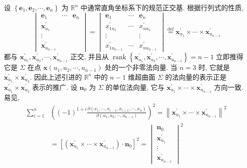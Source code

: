 \begin{definition}
设 $\left\{\boldsymbol{e}_{1}, \boldsymbol{e}_{2}, \cdots, \boldsymbol{e}_{n}\right\}$ 为 $\mathbb{R}^{n}$ 中通常直角坐标系下的规范正交基. 根据行列式的性质,
\[
  \begin{vmatrix}
    \boldsymbol{e}_{1} & \cdots & \boldsymbol{e}_{n} \\
    \boldsymbol{x}_{u_{1}}^{\prime} & & \\
    \vdots & & \\
    \boldsymbol{x}_{u_{n-1}}^{\prime} & &
  \end{vmatrix}
  =\begin{vmatrix}
    \boldsymbol{e}_{1} & \cdots & \boldsymbol{e}_{n} \\
    x_{1 u_{1}}^{\prime} & \cdots & x_{n u_{1}}^{\prime} \\
    \vdots & & \vdots \\
    x_{1 u_{n-1}}^{\prime} & \cdots & x_{n u_{n-1}}^{\prime}
  \end{vmatrix}
  \overset{\text{def}}{=} \boldsymbol{x}_{u_{1}}^{\prime} \times \cdots \times \boldsymbol{x}_{u_{n-1}}^{\prime}
\]
都与 $\boldsymbol{x}_{u_{1}}^{\prime}, \boldsymbol{x}_{u_{2}}^{\prime}, \cdots, \boldsymbol{x}_{u_{n-1}}^{\prime}$ 正交, 并且从 $\operatorname{rank}\left\{\boldsymbol{x}_{u_{1}}^{\prime}, \boldsymbol{x}_{u_{2}}^{\prime}, \cdots, \boldsymbol{x}_{u_{n-1}}^{\prime}\right\}=n-1$ 立即推得它是 $\Sigma$ 在点 $\boldsymbol{x}\left(u_{1}, u_{2}, \cdots, u_{n-1}\right)$ 处的一个非零法向量. 当 $n=3$ 时, 它就是 $\boldsymbol{x}_{u_{1}}^{\prime} \times \boldsymbol{x}_{u_{2}}^{\prime}$. 因此上述引进的 $\mathbb{R}^{n}$ 中的 $n-1$ 维超曲面 $\Sigma$ 的法向量的表示正是 $\boldsymbol{x}_{u_{1}}^{\prime} \times \boldsymbol{x}_{u_{2}}^{\prime}$ 表示的推广. 设 $\boldsymbol{n}_{0}$ 为 $\Sigma$ 的单位法向量, 它与 $\boldsymbol{x}_{u_{1}}^{\prime} \times \cdots \times \boldsymbol{x}_{u_{n-1}}^{\prime}$ 方向一致. 易见,
\begin{align*}
  \sum_{i=1}^{n} & \left((-1)^{1+i} \frac{\partial\left(x_{1}, \cdots, x_{i-1}, x_{i+1}, \cdots, x_{n}\right)}{\partial\left(u_{1}, u_{2}, \cdots, u_{n-1}\right)}\right)^{2}=\left\|\boldsymbol{x}_{u_{1}}^{\prime} \times \cdots \times \boldsymbol{x}_{u_{n-1}}^{\prime}\right\|^{2} \\
  & =\left[\left(\boldsymbol{x}_{u_{1}}^{\prime} \times \cdots \times \boldsymbol{x}_{u_{n-1}}^{\prime}\right) \cdot \boldsymbol{n}_{0}\right]^{2}
    =\begin{vmatrix} \boldsymbol{n}_{0} \\ \boldsymbol{x}_{u_{1}}^{\prime} \\ \vdots \\ \boldsymbol{x}_{u_{n-1}}^{\prime} \end{vmatrix}^{2} \\

\end{align*}
\end{definition}
